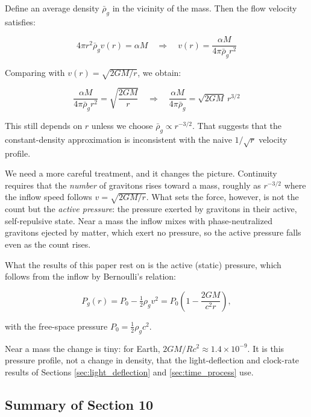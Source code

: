 \documentclass[12pt, a4paper]{article}
\begin{document}
Define an average density \( \bar{\rho}_g \) in the vicinity of the mass. Then the flow velocity satisfies:

\[
4\pi r^2 \bar{\rho}_g v(r) = \alpha M \quad \Rightarrow \quad v(r) = \frac{\alpha M}{4\pi \bar{\rho}_g r^2}
\]

Comparing with \( v(r) = \sqrt{2GM/r} \), we obtain:

\[
\frac{\alpha M}{4\pi \bar{\rho}_g r^2} = \sqrt{\frac{2GM}{r}} \quad \Rightarrow \quad \frac{\alpha M}{4\pi \bar{\rho}_g} = \sqrt{2GM} \, r^{3/2}
\]

This still depends on \( r \) unless we choose \( \bar{\rho}_g \propto r^{-3/2} \). That suggests that the constant-density approximation is inconsistent with the naive \( 1/\sqrt{r} \) velocity profile.

We need a more careful treatment, and it changes the picture. Continuity requires that the \emph{number} of gravitons rises toward a mass, roughly as \( r^{-3/2} \) where the inflow speed follows \( v = \sqrt{2GM/r} \). What sets the force, however, is not the count but the \emph{active pressure}: the pressure exerted by gravitons in their active, self-repulsive state. Near a mass the inflow mixes with phase-neutralized gravitons ejected by matter, which exert no pressure, so the active pressure falls even as the count rises. 

What the results of this paper rest on is the active (static) pressure, which follows from the inflow by Bernoulli's relation:

\[
P_g(r) = P_0 - \tfrac{1}{2}\rho_g v^2 = P_0 \left(1 - \frac{2GM}{c^2 r}\right),
\]

with the free-space pressure \( P_0 = \tfrac{1}{2}\rho_g c^2 \). 

Near a mass the change is tiny: for Earth, \( 2GM/Rc^2 \approx 1.4 \times 10^{-9} \). It is this pressure profile, not a change in density, that the light-deflection and clock-rate results of Sections \ref{sec:light_deflection} and \ref{sec:time_process} use.

\subsection{Summary of Section 10}
\label{subsec:summary_10}
\end{document}
